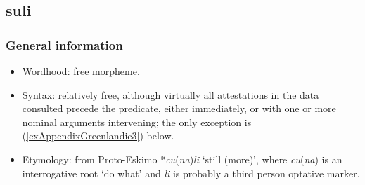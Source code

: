\subsection{suli}
\subsubsection{General information}
\begin{itemize}
	\item Wordhood: free morpheme.
	\item Syntax: relatively free, although virtually all attestations in the data consulted precede the predicate, either immediately, or with one or more nominal arguments intervening; the only exception is (\ref{exAppendixGreenlandic3}) below.
	\item Etymology: from Proto-Eskimo \mbox{*\textit{cu}(\textit{na})\textit{li}} \lq still (more)', where \mbox{\textit{cu}(\textit{na}}) is an interrogative root \lq do what' and \textit{li} is probably a third person optative marker.
\end{itemize}

